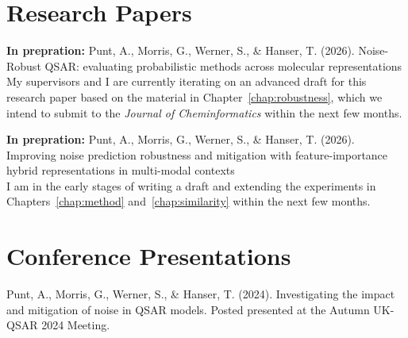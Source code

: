 \section{Research Papers}
\textbf{In prepration:} Punt, A., Morris, G., Werner, S., \& Hanser, T. (2026). Noise-Robust QSAR: evaluating probabilistic methods across molecular representations \\
My supervisors and I are currently iterating on an advanced draft for this research paper based on the material in Chapter~\ref{chap:robustness}, which we intend to submit to the \textit{Journal of Cheminformatics} within the next few months.

\textbf{In prepration:} Punt, A., Morris, G., Werner, S., \& Hanser, T. (2026). Improving noise prediction robustness and mitigation with feature-importance hybrid representations in multi-modal contexts \\ I am in the early stages of writing a draft and extending the experiments in Chapters~\ref{chap:method} and~\ref{chap:similarity} within the next few months.

\section{Conference Presentations}
Punt, A., Morris, G., Werner, S., \& Hanser, T. (2024). Investigating the impact and mitigation of noise in QSAR models. Posted presented at the Autumn UK-QSAR 2024 Meeting.


